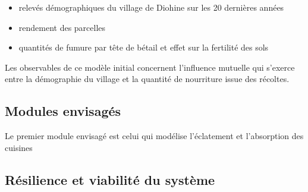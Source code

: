 \begin{itemize}
\item relevés démographiques du village de Diohine sur les 20 dernières années
\item rendement des parcelles
\item quantités de fumure par tête de bétail et effet sur la fertilité des sols
\end{itemize}


Les observables de ce modèle initial concernent l'influence mutuelle qui s'exerce entre la démographie du village et la quantité de nourriture issue des récoltes.

\subsection{Modules envisagés }

Le premier module envisagé est celui qui modélise l'éclatement et l'absorption des cuisines



\subsection{Résilience et viabilité du système}
